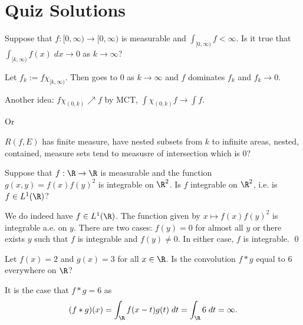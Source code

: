\newpage
\section{Quiz Solutions}


























\begin{quizsol}
Suppose that $f: [0,\infty) \to [0,\infty)$ is measurable and $\int_{[0,\infty)} f < \infty$. Is it true that $\int_{[k,\infty)} f(x) \; dx \to 0$ as $k \to \infty$? 
\end{quizsol}

\pf Let $f_k:= f \chi_{[k,\infty)}$. Then goes to $0$ as $k \to \infty$ and $f$ dominates $f_k$ and $f_k \to 0$. 


Another idea: $f \chi_{(0,k)} \nearrow f$ by MCT, $\int \chi_{(0,k)} f \to \int f$. 


Or 

$R(f,E)$ has finite measure, have nested subsets from $k$ to infinite areas, nested, contained, measure sets tend to measusre of intersection which is 0? 













\begin{quizsol}
Suppose that $f: \R \to \R$ is measurable and the function $g(x,y)= f(x)f(y)^2$ is integrable on $\R^2$. Is $f$ integrable on $\R^2$, i.e. is $f \in L^1(\R)$?
\end{quizsol}

\pf We do indeed have $f \in L^1(\R)$. The function given by $x \mapsto f(x)f(y)^2$ is integrable a.e. on $y$. There are two cases: $f(y)=0$ for almost all $y$ or there exists $y$ such that $f$ is integrable and $f(y) \neq 0$. In either case, $f$ is integrable. \qed \\






\begin{quizsol}
Let $f(x)=2$ and $g(x)=3$ for all $x \in \R$. Is the convolution $f*g$ equal to 6 everywhere on $\R$?
\end{quizsol}

\pf It is the case that $f*g=6$ as
	\[
	(f*g)(x)= \int_\R f(x-t)g(t) \; dt= \int_\R 6 \; dt = \infty.
	\]












